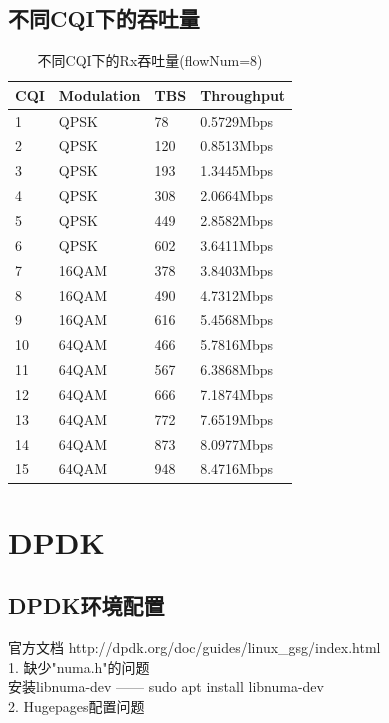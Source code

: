 \documentclass{article}
\begin{document}
\subsection{不同CQI下的吞吐量}
\begin{table}[H]
\caption{不同CQI下的Rx吞吐量(flowNum=8)}
\centering
\begin{tabular}{|l|l|l|l|}%
	\hline  %
	CQI &	Modulation	&	TBS	&	Throughput	\\
	\hline
	1	&	QPSK		&	78	&	0.5729Mbps	\\
	\hline
	2	&	QPSK		&	120	&	0.8513Mbps	\\
	\hline
	3	&	QPSK		&	193	&	1.3445Mbps	\\
	\hline
	4	&	QPSK		&	308	&	2.0664Mbps	\\
	\hline
	5	&	QPSK		&	449	&	2.8582Mbps	\\
	\hline
	6	&	QPSK		&	602	&	3.6411Mbps	\\
	\hline
	7	&	16QAM		&	378	&	3.8403Mbps	\\
	\hline
	8	&	16QAM		&	490	&	4.7312Mbps	\\
	\hline
	9	&	16QAM		&	616	&	5.4568Mbps	\\
	\hline
	10	&	64QAM		&	466	&	5.7816Mbps	\\
	\hline
	11	&	64QAM		&	567	&	6.3868Mbps	\\
	\hline
	12	&	64QAM		&	666	&	7.1874Mbps	\\
	\hline
	13	&	64QAM		&	772	&	7.6519Mbps	\\
	\hline
	14	&	64QAM		&	873	&	8.0977Mbps	\\
	\hline
	15	&	64QAM		&	948	&	8.4716Mbps	\\
	\hline  %
\end{tabular}
\end{table}

\section{DPDK}
\subsection{DPDK环境配置}
官方文档 http://dpdk.org/doc/guides/linux\_gsg/index.html \\
1. 缺少"numa.h"的问题\\
安装libnuma-dev —— sudo apt install libnuma-dev\\
2. Hugepages配置问题\\
\end{document}
